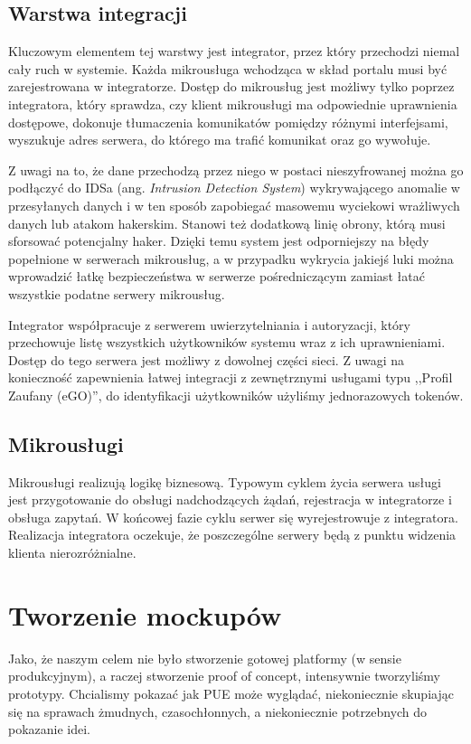 \documentclass[licencjacka]{pracamgr}
\begin{document}
\subsection{Warstwa integracji}

Kluczowym elementem tej warstwy jest integrator, przez który przechodzi niemal
cały ruch w systemie. Każda mikrousługa wchodząca w skład portalu musi być
zarejestrowana w integratorze. Dostęp do mikrousług jest możliwy tylko poprzez
integratora, który sprawdza, czy klient mikrousługi ma odpowiednie uprawnienia
dostępowe, dokonuje tłumaczenia komunikatów pomiędzy różnymi interfejsami,
wyszukuje adres serwera, do którego ma trafić komunikat oraz go wywołuje.

Z uwagi na to, że dane przechodzą przez niego w postaci nieszyfrowanej można
go podłączyć do IDSa (ang. \textit{Intrusion Detection System}) wykrywającego
anomalie w przesyłanych danych i w ten sposób zapobiegać masowemu wyciekowi
wrażliwych danych lub atakom hakerskim. Stanowi też dodatkową linię obrony, którą
musi sforsować potencjalny haker. Dzięki temu system jest odporniejszy na błędy
popełnione w serwerach mikrousług, a w przypadku wykrycia jakiejś luki można
wprowadzić łatkę bezpieczeństwa w serwerze pośredniczącym zamiast łatać
wszystkie podatne serwery mikrousług.

Integrator współpracuje z serwerem uwierzytelniania i autoryzacji, który przechowuje
listę wszystkich użytkowników systemu wraz z ich uprawnieniami. Dostęp do tego
serwera jest możliwy z dowolnej części sieci. Z uwagi na konieczność zapewnienia
łatwej integracji z zewnętrznymi usługami typu ,,Profil Zaufany (eGO)'', do
identyfikacji użytkowników użyliśmy jednorazowych tokenów.

\subsection{Mikrousługi}

Mikrousługi realizują logikę biznesową. Typowym cyklem życia serwera usługi jest
przygotowanie do obsługi nadchodzących żądań, rejestracja w integratorze i obsługa
zapytań. W końcowej fazie cyklu serwer się wyrejestrowuje z integratora. Realizacja
integratora oczekuje, że poszczególne serwery będą z punktu widzenia klienta
nierozróżnialne.


\section{Tworzenie mockupów}
Jako, że naszym celem nie było stworzenie gotowej platformy (w sensie produkcyjnym), a raczej stworzenie proof of concept,
intensywnie tworzyliśmy prototypy. Chcialismy pokazać jak PUE może wyglądać, niekoniecznie skupiając się na
sprawach żmudnych, czasochłonnych, a niekoniecznie potrzebnych do pokazanie idei.
\end{document}
